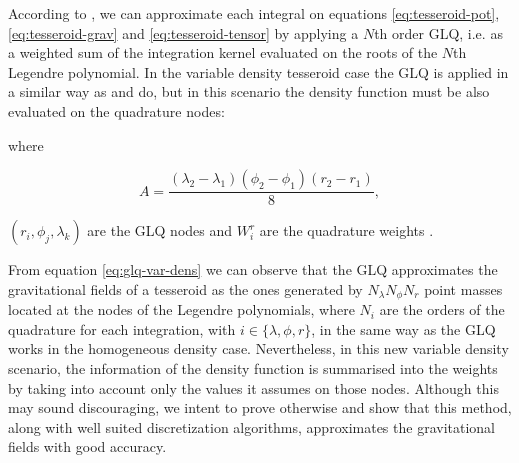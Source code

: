 \documentclass[extra]{gji}
\begin{document}
According to \citet[p.~390]{Hildebrand1987}, we can approximate each 
integral on equations \ref{eq:tesseroid-pot}, \ref{eq:tesseroid-grav} 
and \ref{eq:tesseroid-tensor} by applying a $N$th order GLQ, i.e. as 
a weighted sum of the integration kernel evaluated on the roots of the 
$N$th Legendre polynomial.
In the variable density tesseroid case the GLQ is applied in a similar 
way as \citet{Asgharzadeh2007} and \citet{Uieda2016} do, but in this 
scenario the density function must be also evaluated on the quadrature 
nodes:


\noindent where

\begin{equation}
    A = 
    \frac{(\lambda_2 - \lambda_1)(\phi_2 - \phi_1)(r_2 - r_1)}{8},
\end{equation}

\noindent $(r_i, \phi_j, \lambda_k)$ are the GLQ nodes and $W_i^r$ are 
the quadrature weights \citep[see their definitions 
on][]{Hildebrand1987}.

From equation \ref{eq:glq-var-dens} we can observe that the GLQ 
approximates the gravitational fields of a tesseroid as the ones 
generated by $N_\lambda N_\phi N_r$ point masses located at the nodes 
of the Legendre polynomials, where $N_i$ are the orders of the 
quadrature for each integration, with $i \in \{ \lambda, \phi, r \}$, 
in the same way as the GLQ works in the homogeneous density case.
Nevertheless, in this new variable density scenario, the information of 
the density function is summarised into the weights by taking into 
account only the values it assumes on those nodes.
Although this may sound discouraging, we intent to prove otherwise and 
show that this method, along with well suited discretization 
algorithms, approximates the gravitational fields with good accuracy.
\end{document}
